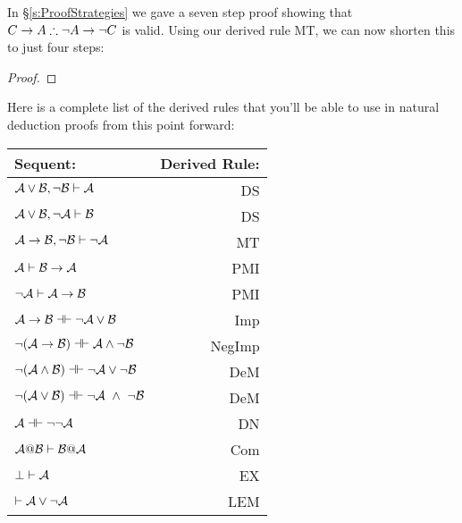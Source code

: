 In  \S\ref{s:ProofStrategies} we gave a seven step proof showing that $C \rightarrow A \therefore \neg A \rightarrow \neg C$ is valid.  Using our derived rule MT, we can now shorten this to just four steps:

\begin{proof}
\open
	 
\close
{} 
\end{proof}
Here is a complete list of the derived rules that you'll be able to use in natural deduction proofs from this point forward:

\begin{center}
\begin{tabular}{l  r}
\textbf{Sequent:}                    &       \textbf{Derived Rule:} \\ \hline
$\mathcal{A} \vee \mathcal{B},  \neg\mathcal{B} \vdash \mathcal{A}$ & DS\\
$\mathcal{A} \vee \mathcal{B},  \neg\mathcal{A}\vdash \mathcal{B}$    &      DS  \\
$\mathcal{A} \rightarrow \mathcal{B},  \neg\mathcal{B} \vdash \neg \mathcal{A}$   &                       MT  \\
$\mathcal{A} \vdash\mathcal{B} \rightarrow \mathcal{A}$  &              PMI  \\
$\neg\mathcal{A}\vdash\mathcal{A}\rightarrow \mathcal{B}$  & PMI\\
$\meta{A} \rightarrow\meta{B} \pequiv \enot\meta{A}\eor \meta{B}$  &                   Imp   \\
$\enot (\meta{A} \rightarrow \meta{B}) \pequiv \meta{A} \eand \enot \meta{B}$  &               NegImp  \\
$\enot (\meta{A} \eand \meta{B})  \pequiv \enot\meta{A}\eor \enot \meta{B}$  &                DeM  \\
$\enot (\meta{A} \eor \meta{B}) \pequiv \enot\meta{A}\ \eand \ \enot \meta{B}$   &               DeM  \\
$\meta{A} \pequiv \enot \enot \meta{A}$     &                              DN  \\
$\mathcal{A} @ \mathcal{B}  \vdash  \mathcal{B} @ \mathcal{A}$ &                          Com \\
$\bot \vdash \mathcal{A}$ & EX \\
 $\vdash \mathcal{A}\vee \neg \mathcal{A}$ &                                                    LEM \\ 
\end{tabular}
\end{center}

